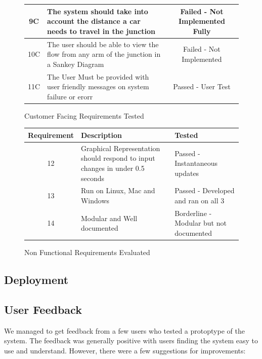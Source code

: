 \documentclass{article}
\begin{document}
\begin{figure}[H]
\begin{center}
\begin{tabular}{ |c|p{9cm}|c| }
                \hline
                9C          & The system should take into account the distance a car needs to travel in the junction & Failed - Not Implemented Fully \\
                \hline
                10C         & The user should be able to view the flow from any arm of the junction in a Sankey Diagram & Failed - Not Implemented \\
                \hline
                11C         & The User Must be provided with user friendly messages on system failure or erorr & Passed - User Test \\
                \hline
            \end{tabular}
            \caption{Customer Facing Requirements Tested}
        \end{center}\label{fig:figure}
    \end{figure}

    \begin{figure}[H]
        \begin{center}
            \begin{tabular}{ |c|p{9cm}|p{5cm}| }
                \hline
                Requirement & Description & Tested \\
                \hline
                12 & Graphical Representation should respond to input changes in under 0.5 seconds & Passed - Instantaneous updates \\
                \hline
                13 & Run on Linux, Mac and Windows & Passed - Developed and ran on all 3 \\
                \hline
                14 & Modular and Well documented & Borderline - Modular but not documented \\
                \hline
            \end{tabular}
            \caption{Non Functional Requirements Evaluated}
        \end{center}\label{fig:figure2k}
    \end{figure}

    \subsection{Deployment}

    \subsection{User Feedback}

    We managed to get feedback from a few users who tested a protoptype of the system. The feedback was generally positive with users finding the system easy to use and understand. However, there were a few suggestions for improvements:
\end{document}
